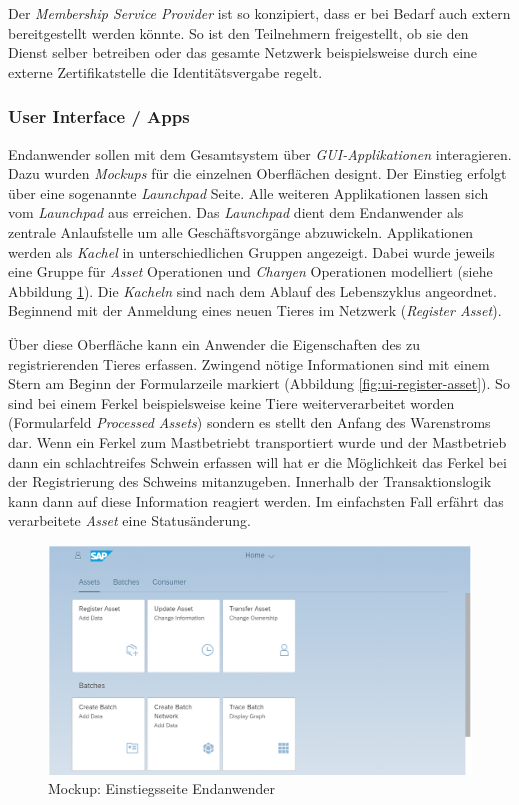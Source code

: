 Der \textit{Membership Service Provider} ist so konzipiert, dass er bei Bedarf auch extern bereitgestellt werden könnte. So ist den Teilnehmern freigestellt, ob sie den Dienst selber betreiben oder das gesamte Netzwerk beispielsweise durch eine externe Zertifikatstelle die Identitätsvergabe regelt.

\subsubsection{User Interface / \DH Apps}
Endanwender sollen mit dem Gesamtsystem über \textit{GUI-Applikationen} interagieren. Dazu wurden \textit{Mockups} für die einzelnen Oberflächen designt. Der Einstieg erfolgt über eine sogenannte \textit{Launchpad} Seite. Alle weiteren Applikationen lassen sich vom \textit{Launchpad} aus erreichen. Das \textit{Launchpad} dient dem Endanwender als zentrale Anlaufstelle um alle Geschäftsvorgänge abzuwickeln. Applikationen werden als \textit{Kachel} in unterschiedlichen Gruppen angezeigt. Dabei wurde jeweils eine Gruppe für \textit{Asset} Operationen und \textit{Chargen} Operationen modelliert (siehe Abbildung \ref{fig:ui-launchpad}). Die \textit{Kacheln} sind nach dem Ablauf des Lebenszyklus angeordnet. Beginnend mit der Anmeldung eines neuen Tieres im Netzwerk (\textit{Register Asset}).

Über diese Oberfläche kann ein Anwender die Eigenschaften des zu registrierenden Tieres erfassen. Zwingend nötige Informationen sind mit einem Stern am Beginn der Formularzeile markiert (Abbildung \ref{fig:ui-register-asset}). So sind bei einem Ferkel beispielsweise keine Tiere weiterverarbeitet worden (Formularfeld \textit{Processed Assets}) sondern es stellt den Anfang des Warenstroms dar. Wenn ein Ferkel zum Mastbetriebt transportiert wurde und der Mastbetrieb dann ein schlachtreifes Schwein erfassen will hat er die Möglichkeit das Ferkel bei der Registrierung des Schweins mitanzugeben. Innerhalb der Transaktionslogik kann dann auf diese Information reagiert werden. Im einfachsten Fall erfährt das verarbeitete \textit{Asset} eine Statusänderung.

\begin{figure}[H]
	\centering
	\includegraphics[width=1\linewidth]{pictures/ui-launchpad}
	\caption[Mockup: Einstiegsseite Endanwender]{Mockup: Einstiegsseite Endanwender}
	\label{fig:ui-launchpad}
\end{figure}

